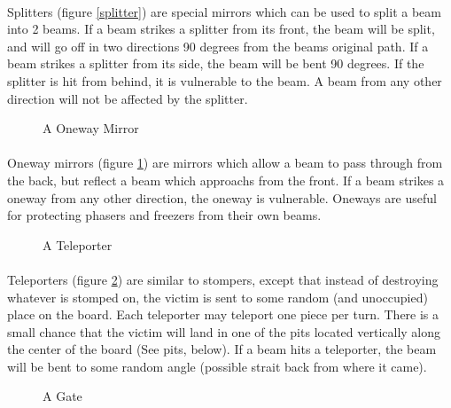 \paragraph[]{}
Splitters (figure \ref{splitter}) are special mirrors which can be
used to split a beam into 2 beams.  If a beam strikes a splitter from
its front, the beam will be split, and will go off in two directions
90 degrees from the beams original path.  If a beam strikes a splitter
from its side, the beam will be bent 90 degrees.  If the splitter is
hit from behind, it is vulnerable to the beam.  A beam from any other
direction will not be affected by the splitter.

\newpage

\begin{figure}[htb]
	\caption{A Oneway Mirror}
	\label{oneway}
\end{figure}

\paragraph[]{}

Oneway mirrors (figure \ref{oneway}) are mirrors which allow a beam to
pass through from the back, but reflect a beam which approachs from
the front.  If a beam strikes a oneway from any other direction, the
oneway is vulnerable.  Oneways are useful for protecting phasers and
freezers from their own beams.

\begin{figure}[htb]
	\caption{A Teleporter}
	\label{teleporter}
\end{figure}

\paragraph[]{}
Teleporters (figure \ref{teleporter}) are similar to stompers, except
that instead of destroying whatever is stomped on, the victim is sent
to some random (and unoccupied) place on the board.  Each teleporter
may teleport one piece per turn.  There is a small chance that the
victim will land in one of the pits located vertically along the
center of the board (See pits, below).  If a beam hits a teleporter,
the beam will be bent to some random angle (possible strait back from
where it came).

\begin{figure}[htb]
	\caption{A Gate}
	\label{gate}
\end{figure}

